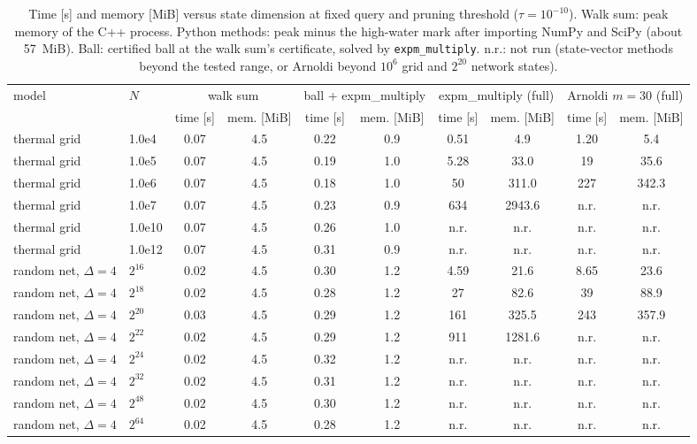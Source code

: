 \documentclass[aps,pra,superscriptaddress,floatfix,longbibliography,twocolumn]{revtex4-2}
\begin{document}
\begin{table}[t]
\footnotesize\setlength{\tabcolsep}{4pt}
\caption{Time [s] and memory [MiB] versus state dimension at fixed query and pruning threshold ($\tau=10^{-10}$). Walk sum: peak memory of the C++ process. Python methods: peak minus the high-water mark after importing NumPy and SciPy (about 57~MiB). Ball: certified ball at the walk sum's certificate, solved by \texttt{expm\_multiply}. n.r.: not run (state-vector methods beyond the tested range, or Arnoldi beyond $10^6$ grid and $2^{20}$ network states).}\label{tab:scaling}
\begin{ruledtabular}
\begin{tabular}{ll|cc|cc|cc|cc}
model & $N$ & \multicolumn{2}{c|}{walk sum} & \multicolumn{2}{c|}{ball + expm\_multiply} & \multicolumn{2}{c|}{expm\_multiply (full)} & \multicolumn{2}{c}{Arnoldi $m=30$ (full)}\\
 & & time [s] & mem. [MiB] & time [s] & mem. [MiB] & time [s] & mem. [MiB] & time [s] & mem. [MiB]\\\hline
thermal grid & 1.0e4 & 0.07 & 4.5 & 0.22 & 0.9 & 0.51 & 4.9 & 1.20 & 5.4 \\
thermal grid & 1.0e5 & 0.07 & 4.5 & 0.19 & 1.0 & 5.28 & 33.0 & 19 & 35.6 \\
thermal grid & 1.0e6 & 0.07 & 4.5 & 0.18 & 1.0 & 50 & 311.0 & 227 & 342.3 \\
thermal grid & 1.0e7 & 0.07 & 4.5 & 0.23 & 0.9 & 634 & 2943.6 & n.r. & n.r. \\
thermal grid & 1.0e10 & 0.07 & 4.5 & 0.26 & 1.0 & n.r. & n.r. & n.r. & n.r. \\
thermal grid & 1.0e12 & 0.07 & 4.5 & 0.31 & 0.9 & n.r. & n.r. & n.r. & n.r. \\
random net, $\Delta=4$ & $2^{16}$ & 0.02 & 4.5 & 0.30 & 1.2 & 4.59 & 21.6 & 8.65 & 23.6 \\
random net, $\Delta=4$ & $2^{18}$ & 0.02 & 4.5 & 0.28 & 1.2 & 27 & 82.6 & 39 & 88.9 \\
random net, $\Delta=4$ & $2^{20}$ & 0.03 & 4.5 & 0.29 & 1.2 & 161 & 325.5 & 243 & 357.9 \\
random net, $\Delta=4$ & $2^{22}$ & 0.02 & 4.5 & 0.29 & 1.2 & 911 & 1281.6 & n.r. & n.r. \\
random net, $\Delta=4$ & $2^{24}$ & 0.02 & 4.5 & 0.32 & 1.2 & n.r. & n.r. & n.r. & n.r. \\
random net, $\Delta=4$ & $2^{32}$ & 0.02 & 4.5 & 0.31 & 1.2 & n.r. & n.r. & n.r. & n.r. \\
random net, $\Delta=4$ & $2^{48}$ & 0.02 & 4.5 & 0.30 & 1.2 & n.r. & n.r. & n.r. & n.r. \\
random net, $\Delta=4$ & $2^{64}$ & 0.02 & 4.5 & 0.28 & 1.2 & n.r. & n.r. & n.r. & n.r. \\
\end{tabular}
\end{ruledtabular}
\end{table}
\end{document}
